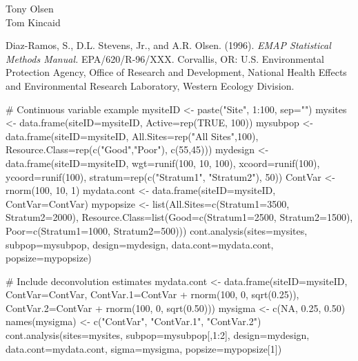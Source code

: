\begin{Author}\relax
Tony Olsen \\
Tom Kincaid 
\end{Author}
\begin{References}\relax
Diaz-Ramos, S., D.L. Stevens, Jr., and A.R. Olsen. (1996).  \emph{EMAP
Statistical Methods Manual.} EPA/620/R-96/XXX.  Corvallis, OR: U.S.
Environmental Protection Agency, Office of Research and Development, National
Health Effects and Environmental Research Laboratory, Western Ecology
Division.
\end{References}
\begin{SeeAlso}\relax
{}
\end{SeeAlso}
\begin{Examples}
\begin{ExampleCode}
# Continuous variable example
mysiteID <- paste("Site", 1:100, sep="")
mysites <- data.frame(siteID=mysiteID, Active=rep(TRUE, 100))
mysubpop <- data.frame(siteID=mysiteID, All.Sites=rep("All Sites",100),
   Resource.Class=rep(c("Good","Poor"), c(55,45)))
mydesign <- data.frame(siteID=mysiteID, wgt=runif(100, 10, 100),
   xcoord=runif(100), ycoord=runif(100), stratum=rep(c("Stratum1",
   "Stratum2"), 50))
ContVar <- rnorm(100, 10, 1)
mydata.cont <- data.frame(siteID=mysiteID, ContVar=ContVar)
mypopsize <- list(All.Sites=c(Stratum1=3500, Stratum2=2000),
   Resource.Class=list(Good=c(Stratum1=2500, Stratum2=1500),
   Poor=c(Stratum1=1000, Stratum2=500)))
cont.analysis(sites=mysites, subpop=mysubpop, design=mydesign,
   data.cont=mydata.cont, popsize=mypopsize)

# Include deconvolution estimates
mydata.cont <- data.frame(siteID=mysiteID, ContVar=ContVar,
   ContVar.1=ContVar + rnorm(100, 0, sqrt(0.25)),
   ContVar.2=ContVar + rnorm(100, 0, sqrt(0.50)))
mysigma <- c(NA, 0.25, 0.50)
names(mysigma) <- c("ContVar", "ContVar.1", "ContVar.2")
cont.analysis(sites=mysites, subpop=mysubpop[,1:2], design=mydesign,
   data.cont=mydata.cont, sigma=mysigma, popsize=mypopsize[1])
\end{ExampleCode}
\end{Examples}

